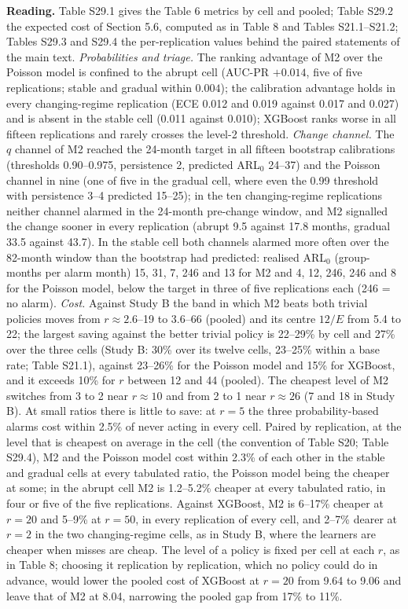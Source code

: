 \textbf{Reading.} Table S29.1 gives the Table 6 metrics by cell and pooled; Table S29.2 the expected cost of Section 5.6, computed as in Table 8 and Tables S21.1--S21.2; Tables S29.3 and S29.4 the per-replication values behind the paired statements of the main text. \emph{Probabilities and triage.} The ranking advantage of M2 over the Poisson model is confined to the abrupt cell (AUC-PR $+0.014$, five of five replications; stable and gradual within $0.004$); the calibration advantage holds in every changing-regime replication (ECE 0.012 and 0.019 against 0.017 and 0.027) and is absent in the stable cell (0.011 against 0.010); XGBoost ranks worse in all fifteen replications and rarely crosses the level-2 threshold. \emph{Change channel.} The $q$ channel of M2 reached the 24-month target in all fifteen bootstrap calibrations (thresholds 0.90--0.975, persistence 2, predicted ARL$_0$ 24--37) and the Poisson channel in nine (one of five in the gradual cell, where even the 0.99 threshold with persistence 3--4 predicted 15--25); in the ten changing-regime replications neither channel alarmed in the 24-month pre-change window, and M2 signalled the change sooner in every replication (abrupt 9.5 against 17.8 months, gradual 33.5 against 43.7). In the stable cell both channels alarmed more often over the 82-month window than the bootstrap had predicted: realised ARL$_0$ (group-months per alarm month) 15, 31, 7, 246 and 13 for M2 and 4, 12, 246, 246 and 8 for the Poisson model, below the target in three of five replications each (246 = no alarm). \emph{Cost.} Against Study B the band in which M2 beats both trivial policies moves from $r \approx 2.6$--19 to $3.6$--66 (pooled) and its centre $12/E$ from 5.4 to 22; the largest saving against the better trivial policy is 22--29\% by cell and 27\% over the three cells (Study B: 30\% over its twelve cells, 23--25\% within a base rate; Table S21.1), against 23--26\% for the Poisson model and 15\% for XGBoost, and it exceeds 10\% for $r$ between 12 and 44 (pooled). The cheapest level of M2 switches from 3 to 2 near $r \approx 10$ and from 2 to 1 near $r \approx 26$ (7 and 18 in Study B). At small ratios there is little to save: at $r = 5$ the three probability-based alarms cost within 2.5\% of never acting in every cell. Paired by replication, at the level that is cheapest on average in the cell (the convention of Table S20; Table S29.4), M2 and the Poisson model cost within 2.3\% of each other in the stable and gradual cells at every tabulated ratio, the Poisson model being the cheaper at some; in the abrupt cell M2 is 1.2--5.2\% cheaper at every tabulated ratio, in four or five of the five replications. Against XGBoost, M2 is 6--17\% cheaper at $r = 20$ and 5--9\% at $r = 50$, in every replication of every cell, and 2--7\% dearer at $r = 2$ in the two changing-regime cells, as in Study B, where the learners are cheaper when misses are cheap. The level of a policy is fixed per cell at each $r$, as in Table 8; choosing it replication by replication, which no policy could do in advance, would lower the pooled cost of XGBoost at $r = 20$ from 9.64 to 9.06 and leave that of M2 at 8.04, narrowing the pooled gap from 17\% to 11\%.

